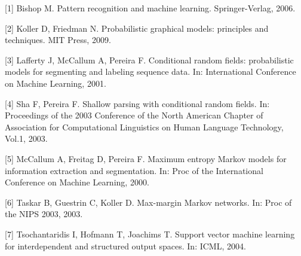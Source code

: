 \documentclass[UTF8,12pt,a4paper,fontset=fandol]{ctexart}
\begin{document}
[1] Bishop M. Pattern recognition and machine learning. Springer-Verlag, 2006.

[2] Koller D, Friedman N. Probabilistic graphical models: principles and techniques. MIT Press, 2009.

[3] Lafferty J, McCallum A, Pereira F. Conditional random fields: probabilistic models for segmenting and labeling sequence data. In: International Conference on Machine Learning, 2001.

[4] Sha F, Pereira F. Shallow parsing with conditional random fields. In: Proceedings of the 2003 Conference of the North American Chapter of Association for Computational Linguistics on Human Language Technology, Vol.1, 2003.

[5] McCallum A, Freitag D, Pereira F. Maximum entropy Markov models for information extraction and segmentation. In: Proc of the International Conference on Machine Learning, 2000.

[6] Taskar B, Guestrin C, Koller D. Max-margin Markov networks. In: Proc of the NIPS 2003, 2003.

[7] Tsochantaridis I, Hofmann T, Joachims T. Support vector machine learning for interdependent and structured output spaces. In: ICML, 2004.
\end{document}
